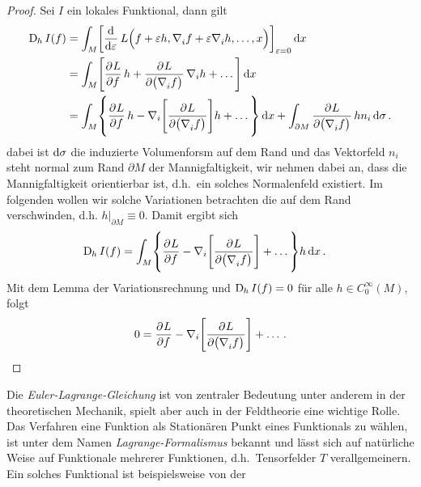 \begin{proof}
Sei $I$ ein lokales Funktional, dann gilt
\begin{equation}
\begin{split}
\Dif_{\,h} {I}(f)&=\int_M \left[\dod{}{\varepsilon}L\Big(f+\varepsilon
h,\tensor{\nabla}{_i} f+\varepsilon\tensor{\nabla}{_i} h,\dots,x\Big)
\right]_{\varepsilon=0}
\dif x\\
&=\int_M
\left[\dpd{L}{f}h+\dpd{L}{\left(\tensor{\nabla}{_i}f\right)}\nabla_i
h+\dots\right] \dif x\\
&=\int_M
\left\{\dpd{L}{f}h-\nabla_i\left[\dpd{L}{\left(\tensor{\nabla}{_i}f\right)}\right]
h+\dots\right\} \dif x+\int_{\partial
M}\dpd{L}{\left(\tensor{\nabla}{_i}f\right)}h n_i\dif \sigma \,.
\end{split}
\end{equation}
dabei ist $\dif \sigma $ die induzierte Volumenforsm auf dem Rand und
das Vektorfeld $n_i$ steht normal zum Rand
$\partial M$ der Mannigfaltigkeit, wir nehmen dabei an, dass die
Mannigfaltigkeit orientierbar ist, d.h.\ ein solches Normalenfeld existiert.
Im folgenden wollen wir solche Variationen betrachten die auf dem Rand
verschwinden, d.h. $h|_{\partial M}\equiv 0$. Damit ergibt sich
\begin{equation}
\begin{split}
\Dif_{\,h} {I}(f)
&=\int_M
\left\{\dpd{L}{f}-\nabla_i\left[\dpd{L}{\left(\tensor{\nabla}{_i}f\right)}\right]
+\dots\right\}h \dif x \,.
\end{split}
\end{equation}
Mit dem Lemma der Variationsrechnung und $\Dif_{\,h} I(f)=0$ für alle $h\in
C^\infty_0(M)$, folgt
\begin{equation}
0=\dpd{L}{f}-\nabla_i\left[\dpd{L}{\left(\tensor{\nabla}{_i}f\right)}\right]
+\dots\,.
\end{equation}
\end{proof}
Die \emph{Euler-Lagrange-Gleichung} ist von zentraler Bedeutung unter anderem in der theoretischen Mechanik,
spielt aber auch in der Feldtheorie eine wichtige Rolle.
Das Verfahren eine Funktion als Stationären Punkt eines Funktionals zu wählen,
ist unter dem Namen \emph{Lagrange-Formalismus} bekannt und lässt sich auf
natürliche Weise auf Funktionale mehrerer Funktionen, d.h.\ Tensorfelder $T$
verallgemeinern.
Ein solches Funktional ist beispielsweise von der
